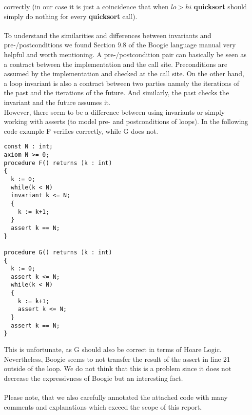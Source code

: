 \documentclass{report}
\begin{document}
correctly (in our case it is just a coincidence that when $lo > hi$ \textbf{quicksort}
should simply do nothing for every \textbf{quicksort} call).
\\\\
To understand the similarities and differences between invariants and pre-/postconditions we found Section 9.8 of the Boogie language manual\cite{leino2008boogie} very helpful and worth mentioning. A pre-/postcondition pair can basically be seen as a contract between the implementation and the call site. Preconditions are assumed by the implementation and checked at the call site. On the other hand, a loop invariant is also a contract between two parties namely the iterations of the past and the iterations of the future. And similarly, the past checks the invariant and the future assumes it.
\\
However, there seem to be a difference between using invariants or simply working with asserts (to model pre- and postconditions of loops).
In the following code example F verifies correctly, while G does not.
\begin{lstlisting}
const N : int;
axiom N >= 0;
procedure F() returns (k : int)
{
  k := 0;
  while(k < N)
  invariant k <= N;
  {
    k := k+1;
  } 
  assert k == N;
}

procedure G() returns (k : int)
{
  k := 0;
  assert k <= N;
  while(k < N)
  {
    k := k+1;
    assert k <= N;
  } 
  assert k == N;
}
\end{lstlisting}
This is unfortunate, as G should also be correct in terms of Hoare Logic\cite{hoare1969axiomatic}. Nevertheless, Boogie seems to not transfer the result of the assert in line 21 outside of the loop.
We do not think that this is a problem since it does not decrease the expressivness of Boogie but an interesting fact.
\\\\
Please note, that we also carefully annotated the attached code with many comments and explanations which exceed the scope of this report.
\end{document}
